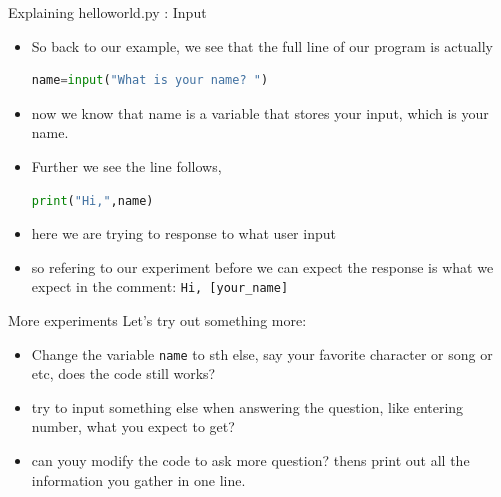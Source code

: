 \documentclass[10pt,xcolor={table,dvipsnames},t]{beamer}
\begin{document}
\begin{frame}[fragile]{Explaining helloworld.py : Input}
  \begin{itemize}
    \item So back to our example, we see that the full line of our program is actually
    \begin{lstlisting}[language=python]
      name=input("What is your name? ")\end{lstlisting}
    \item now we know that name is a variable that stores your input, which is your name.
    \item Further we see the line follows,
    \begin{lstlisting}[language=python]
      print("Hi,",name)\end{lstlisting}
    \item here we are trying to response to what user input
    \item so refering to our experiment before we can expect the response is what we expect in the comment: \texttt{Hi, [your\_name]}
  \end{itemize}
\end{frame}

\begin{frame}[fragile]{More experiments}
  Let's try out something more:
  \begin{itemize}
    \item Change the variable \texttt{name} to sth else, say your favorite character or song or etc, does the code still works?
    \item try to input something else when answering the question, like entering number, what you expect to get?
    \item can youy modify the code to ask more question? thens print out all the information you gather in one line.
  \end{itemize}
\end{frame}
\end{document}
